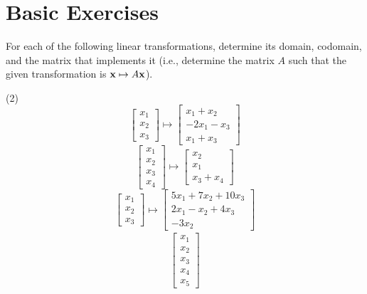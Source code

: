 \section{Basic Exercises}

For each of the following linear transformations, determine its domain,
codomain, and the matrix that implements it (i.e., determine the
matrix $A$ such that the given transformation is $\mathbf x \mapsto A \mathbf x$).
\begin{tasks}[style=enumerate](2)
\task
  \begin{displaymath}
    \begin{bmatrix}
      x_1 \\ x_2 \\ x_3
    \end{bmatrix}
    \mapsto
    \begin{bmatrix}
      x_1 + x_2 \\
      -2x_1 - x_3 \\
      x_1 + x_3
    \end{bmatrix}
  \end{displaymath}
\task
  \begin{displaymath}
    \begin{bmatrix}
      x_1 \\ x_2 \\ x_3 \\ x_4
    \end{bmatrix}
    \mapsto
    \begin{bmatrix}
      x_2 \\ x_1 \\ x_3 + x_4
    \end{bmatrix}
  \end{displaymath}
\task
  \begin{displaymath}
    \begin{bmatrix} x_1 \\ x_2 \\ x_3 \end{bmatrix}
    \mapsto
    \begin{bmatrix}
      5x_1 + 7x_2 + 10x_3 \\
      2x_1 - x_2 + 4x_3 \\
      -3x_2
    \end{bmatrix}
  \end{displaymath}
\task
  \begin{align*}
    \begin{bmatrix} x_{1} \\ x_{2} \\ x_{3} \\ x_{4} \\ x_{5} \end{bmatrix}

\end{align*}
\end{tasks}
